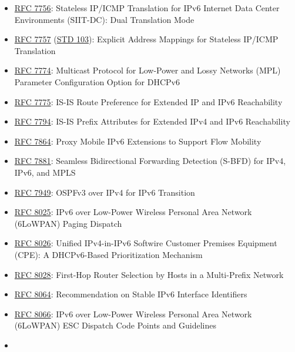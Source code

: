 \documentclass[
]{article}
\begin{document}
\begin{itemize}
  \href{https://www.rfc-editor.org/info/rfc7755}{RFC 7755}: SIIT-DC:
  Stateless IP/ICMP Translation for IPv6 Data Center Environments
\item
  \href{https://www.rfc-editor.org/info/rfc7756}{RFC 7756}: Stateless
  IP/ICMP Translation for IPv6 Internet Data Center Environments
  (SIIT-DC): Dual Translation Mode
\item
  \href{https://www.rfc-editor.org/info/rfc7757}{RFC 7757}
  (\href{https://www.rfc-editor.org/info/std103}{STD 103}): Explicit
  Address Mappings for Stateless IP/ICMP Translation
\item
  \href{https://www.rfc-editor.org/info/rfc7774}{RFC 7774}: Multicast
  Protocol for Low-Power and Lossy Networks (MPL) Parameter
  Configuration Option for DHCPv6
\item
  \href{https://www.rfc-editor.org/info/rfc7775}{RFC 7775}: IS-IS Route
  Preference for Extended IP and IPv6 Reachability
\item
  \href{https://www.rfc-editor.org/info/rfc7794}{RFC 7794}: IS-IS Prefix
  Attributes for Extended IPv4 and IPv6 Reachability
\item
  \href{https://www.rfc-editor.org/info/rfc7864}{RFC 7864}: Proxy Mobile
  IPv6 Extensions to Support Flow Mobility
\item
  \href{https://www.rfc-editor.org/info/rfc7881}{RFC 7881}: Seamless
  Bidirectional Forwarding Detection (S-BFD) for IPv4, IPv6, and MPLS
\item
  \href{https://www.rfc-editor.org/info/rfc7949}{RFC 7949}: OSPFv3 over
  IPv4 for IPv6 Transition
\item
  \href{https://www.rfc-editor.org/info/rfc8025}{RFC 8025}: IPv6 over
  Low-Power Wireless Personal Area Network (6LoWPAN) Paging Dispatch
\item
  \href{https://www.rfc-editor.org/info/rfc8026}{RFC 8026}: Unified
  IPv4-in-IPv6 Softwire Customer Premises Equipment (CPE): A
  DHCPv6-Based Prioritization Mechanism
\item
  \href{https://www.rfc-editor.org/info/rfc8028}{RFC 8028}: First-Hop
  Router Selection by Hosts in a Multi-Prefix Network
\item
  \href{https://www.rfc-editor.org/info/rfc8064}{RFC 8064}:
  Recommendation on Stable IPv6 Interface Identifiers
\item
  \href{https://www.rfc-editor.org/info/rfc8066}{RFC 8066}: IPv6 over
  Low-Power Wireless Personal Area Network (6LoWPAN) ESC Dispatch Code
  Points and Guidelines
\item

\end{itemize}
\end{document}
